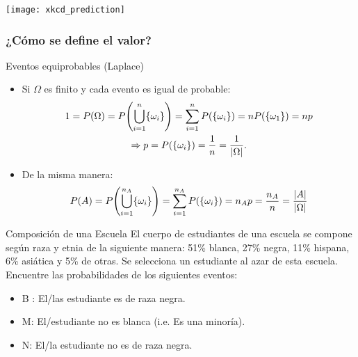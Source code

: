 \documentclass[table]{beamer}
\begin{document}
\begin{frame}
    \begin{center}
        \texttt{[image: xkcd\_prediction]}
    \end{center}
\end{frame}

\begin{frame}
    \frametitle{¿Cómo se define el valor?}
    \begin{block}{Eventos equiprobables (Laplace)}
        \begin{itemize}
            \item Si $\Omega$ es finito y cada evento es igual de probable:
                \begin{multline*}
                    1 = \prob{\Omega} = \prob{\bigcup_{i = 1}^{n} \bparens{\omega_{i}}} = \sum_{i = 1}^{n} \prob{\bparens{\omega_{i}}} = n \prob{\bparens{\omega_{1}}} = n p
                    \\
                    \Rightarrow p = \prob{\bparens{\omega_{i}}} = \frac{1}{n} = \frac{1}{\vparens{\Omega}} .
                \end{multline*}
            \item De la misma manera:
                \begin{equation*}
                    \prob{A} = \prob{\bigcup_{i = 1}^{n_{A}} \bparens{\omega_{i}}} = \sum_{i = 1}^{n_{A}} \prob{\bparens{\omega_{i}}} = n_{A} p = \frac{n_{A}}{n} = \frac{\vparens{A}}{\vparens{\Omega}}
                \end{equation*}
        \end{itemize}
    \end{block}
\end{frame}

\begin{frame}
	 \begin{block}{Composición de una Escuela}
		El cuerpo de estudiantes de una escuela se compone según raza y etnia de la siguiente manera: 51\% blanca, 27\% negra, 11\% hispana, 6\% asiática y 5\% de otras. Se selecciona un estudiante al azar de esta escuela. Encuentre las probabilidades de los siguientes eventos:
	\begin{itemize}
		\item B : El/las estudiante es de raza negra.
		\item M: El/estudiante no es blanca (i.e. Es una minoría).
		\item N: El/la estudiante no es de raza negra.
	\end{itemize}

    \end{block}
\end{frame}
\end{document}
